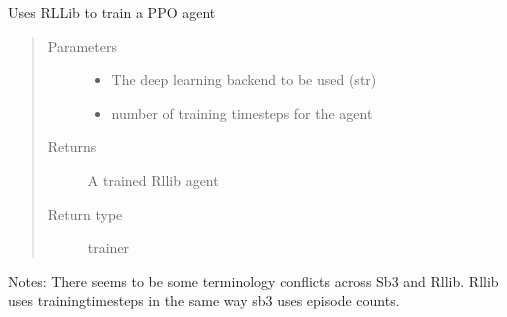 \documentclass[letterpaper,10pt,english]{sphinxmanual}
\begin{document}

\begin{fulllineitems}
\label{\detokenize{source/yawning_titan.experiment_helpers:yawning_titan.experiment_helpers.rllib.train_impala}}
\end{fulllineitems}


\begin{fulllineitems}
\label{\detokenize{source/yawning_titan.experiment_helpers:yawning_titan.experiment_helpers.rllib.train_ppo}}
\sphinxAtStartPar
Uses RLLib to train a PPO agent
\begin{quote}\begin{description}
\item[{Parameters}] \leavevmode\begin{itemize}
\item {}
\sphinxAtStartPar
{} \textendash{} The deep learning backend to be used (str)

\item {}
\sphinxAtStartPar
{} \textendash{} number of training timesteps for the agent

\end{itemize}

\item[{Returns}] \leavevmode
\sphinxAtStartPar
A trained Rllib agent

\item[{Return type}] \leavevmode
\sphinxAtStartPar
trainer

\end{description}\end{quote}

\sphinxAtStartPar
Notes: There seems to be some terminology conflicts across Sb3 and Rllib.
Rllib uses training\sphinxhyphen{}timesteps in the same way sb3 uses episode counts.

\end{fulllineitems}
\end{document}
